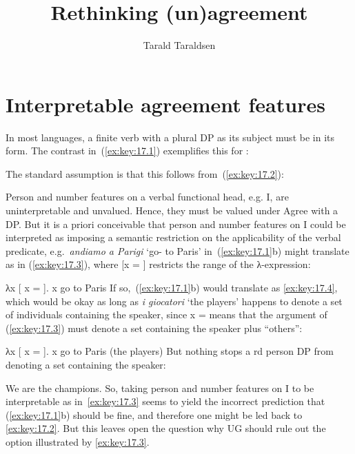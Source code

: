 \documentclass[output=paper]{langsci/langscibook}
\author{Tarald Taraldsen}
\title{Rethinking (un)agreement}
\begin{document}
\glsresetall

\section{Interpretable agreement features}\label{sec:key:17.1}

In most languages, a finite verb with a plural DP as its subject must be in its
\Tpl{} form. The contrast in~(\ref{ex:key:17.1}) exemplifies this for :

\ea\label{ex:key:17.1} 
    \ea[]{%
    \gll I giocatori vanno a Parigi.\\
        the players go-\Tpl{} to Paris\\
    \glt}
    \z
\z
The standard assumption is that this follows from~(\ref{ex:key:17.2}):

\ea\label{ex:key:17.2}
    \ea Person and number features on a verbal functional head, e.g. I, are
    uninterpretable and unvalued.
    \ex Hence, they must be valued under Agree with a DP.
    \z
\z
But it is a priori conceivable that person and number features on I could be
interpreted as imposing a semantic restriction on the applicability of the
verbal predicate, e.g.\ \emph{andiamo a Parigi} ‘go-\Fpl{} to Paris’
in~(\ref{ex:key:17.1}b) might translate as in (\ref{ex:key:17.3}), where [x = \Fpl{}]
restricts the range of the λ-expression:

\ea\label{ex:key:17.3}
    λx [ x = \Fpl{}]. x go to Paris
\z
If so,~(\ref{ex:key:17.1}b) would translate as \eqref{ex:key:17.4}, which would be okay as long as
\emph{i giocatori} ‘the players’ happens to denote a set of individuals
containing the speaker, since x = \Fpl{} means that the argument of
(\ref{ex:key:17.3}) must denote a set containing the speaker plus “others”:

\ea\label{ex:key:17.4}
    λx [ x = \Fpl{}]. x go to Paris (the players)
\z
But nothing stops a \Third{}rd person DP from denoting a set containing the
speaker:

\ea\label{ex:key:17.5}
    We are the champions.
\z
So, taking person and number features on I to be interpretable as
in~\eqref{ex:key:17.3} seems to yield the incorrect prediction that
(\ref{ex:key:17.1}b) should be fine, and therefore one might be led back to
\eqref{ex:key:17.2}. But this leaves open the question why UG should rule out
the option illustrated by \eqref{ex:key:17.3}.
\end{document}
